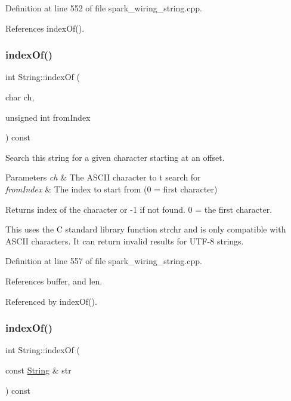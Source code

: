 Definition at line 552 of file spark\+\_\+wiring\+\_\+string.\+cpp.



References index\+Of().

\mbox{\label{class_string_a0a9cb3d76e6e9b7cd1d8666cc84149ea}} 
\subsubsection{\texorpdfstring{index\+Of()}{indexOf()}\hspace{0.1cm}{\footnotesize\ttfamily [2/4]}}
{\footnotesize\ttfamily int String\+::index\+Of (\begin{DoxyParamCaption}\item[{char}]{ch,  }\item[{unsigned int}]{from\+Index }\end{DoxyParamCaption}) const}



Search this string for a given character starting at an offset. 


\begin{DoxyParams}{Parameters}
{\em ch} & The A\+S\+C\+II character to t search for\\
\hline
{\em from\+Index} & The index to start from (0 = first character)\\
\hline
\end{DoxyParams}
\begin{DoxyReturn}{Returns}
index of the character or -\/1 if not found. 0 = the first character.
\end{DoxyReturn}
This uses the C standard library function strchr and is only compatible with A\+S\+C\+II characters. It can return invalid results for U\+T\+F-\/8 strings. 

Definition at line 557 of file spark\+\_\+wiring\+\_\+string.\+cpp.



References buffer, and len.



Referenced by index\+Of().

\mbox{\label{class_string_ab2fac51c5e56215d0b92a70cce39d966}} 
\subsubsection{\texorpdfstring{index\+Of()}{indexOf()}\hspace{0.1cm}{\footnotesize\ttfamily [3/4]}}
{\footnotesize\ttfamily int String\+::index\+Of (\begin{DoxyParamCaption}\item[{const \hyperlink{class_string}{String} \&}]{str }\end{DoxyParamCaption}) const}



